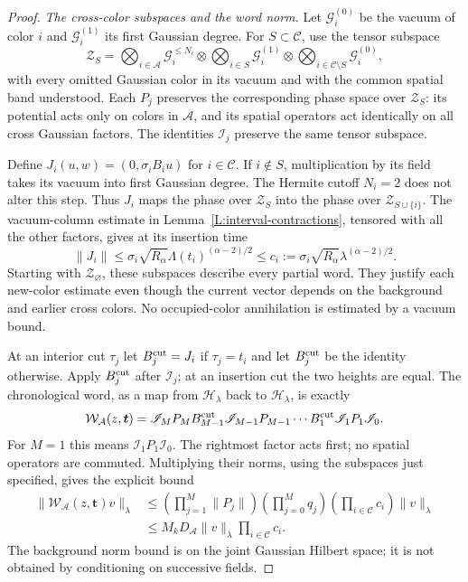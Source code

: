 \documentclass[12pt]{article}
\numberwithin{equation}{section}
\theoremstyle{definition}
\begin{document}
\begin{proof}
  \emph{The cross-color subspaces and the word norm.}
  Let $\mathscr G_i^{(0)}$ be the vacuum of color $i$ and
  $\mathscr G_i^{(1)}$ its first Gaussian degree. For
  $S\subset\mathcal C$, use the tensor subspace
  \[
    \mathscr Z_S=
    \bigotimes_{i\in\mathcal A}\mathscr G_i^{\le N_i}
    \otimes\bigotimes_{i\in S}\mathscr G_i^{(1)}
    \otimes\bigotimes_{i\in\mathcal C\setminus S}
    \mathscr G_i^{(0)},
  \]
  with every omitted Gaussian color in its vacuum and with the common
  spatial band understood. Each $P_j$ preserves the corresponding
  phase space over $\mathscr Z_S$: its potential acts only on colors in
  $\mathcal A$, and its spatial operators act identically on all cross
  Gaussian factors. The identities $\mathscr I_j$ preserve the same
  tensor subspace.

  Define $J_i(u,w)=(0,\sigma_i B_i u)$ for $i\in\mathcal C$.
  If $i\notin S$, multiplication by its field takes its vacuum into
  first Gaussian degree. The Hermite cutoff $N_i=2$ does not alter this
  step. Thus $J_i$ maps the phase over $\mathscr Z_S$ into the phase
  over $\mathscr Z_{S\cup\{i\}}$. The vacuum-column estimate in
  Lemma~\ref{L:interval-contractions}, tensored with all the other
  factors, gives at its insertion time
  \begin{equation}\label{E:split-fresh-insertion}
    \|J_i\|\le\sigma_i\sqrt{R_\alpha}
    \Lambda(t_i)^{(\alpha-2)/2}
    \le c_i:=\sigma_i\sqrt{R_\alpha}\lambda^{(\alpha-2)/2}.
  \end{equation}
  Starting with $\mathscr Z_\varnothing$, these subspaces describe every
  partial word. They justify each new-color estimate even though the
  current vector depends on the background and earlier cross colors.
  No occupied-color annihilation is estimated by a vacuum bound.

  At an interior cut $\tau_j$ let $B_j^{\rm cut}=J_i$ if
  $\tau_j=t_i$ and let $B_j^{\rm cut}$ be the identity otherwise.
  Apply $B_j^{\rm cut}$ after $\mathscr I_j$; at an insertion cut the
  two heights are equal. The chronological word, as a map from
  $\mathcal H_\lambda$ back to $\mathcal H_\lambda$, is exactly
  \[
    \mathcal W_{\mathcal A}(z,\boldsymbol t)
    =\mathscr I_M P_M B_{M-1}^{\rm cut}\mathscr I_{M-1}P_{M-1}
    \cdots B_1^{\rm cut}\mathscr I_1P_1\mathscr I_0.
  \]
  For $M=1$ this means $\mathscr I_1P_1\mathscr I_0$.
  The rightmost factor acts first; no spatial operators are commuted.
  Multiplying their norms, using the subspaces just specified,
  gives the explicit bound
  \begin{equation}\label{E:split-word-product}
    \begin{split}
      \|\mathcal W_{\mathcal A}(z,\boldsymbol t)v\|_\lambda
      &\le\left(\prod_{j=1}^M\|P_j\|\right)
      \left(\prod_{j=0}^M q_j\right)
      \left(\prod_{i\in\mathcal C}c_i\right)\|v\|_\lambda\\
      &\le M_kD_{\mathcal A}\|v\|_\lambda
      \prod_{i\in\mathcal C}c_i.
    \end{split}
  \end{equation}
  The background norm bound is on the joint Gaussian Hilbert space;
  it is not obtained by conditioning on successive fields.


\end{proof}
\end{document}

